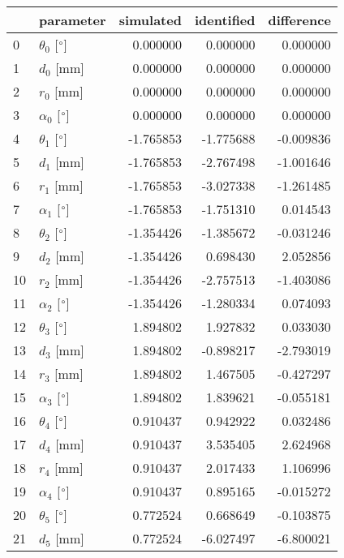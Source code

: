\documentclass{standalone}%
\begin{document}
%
\normalsize%
\begin{tabular}{llrrr}
\toprule
{} &                 parameter & simulated & identified & difference \\
\midrule
0  &  $\theta_{0}$ [$\degree$] &  0.000000 &   0.000000 &   0.000000 \\
1  &              $d_{0}$ [mm] &  0.000000 &   0.000000 &   0.000000 \\
2  &              $r_{0}$ [mm] &  0.000000 &   0.000000 &   0.000000 \\
3  &  $\alpha_{0}$ [$\degree$] &  0.000000 &   0.000000 &   0.000000 \\
4  &  $\theta_{1}$ [$\degree$] & -1.765853 &  -1.775688 &  -0.009836 \\
5  &              $d_{1}$ [mm] & -1.765853 &  -2.767498 &  -1.001646 \\
6  &              $r_{1}$ [mm] & -1.765853 &  -3.027338 &  -1.261485 \\
7  &  $\alpha_{1}$ [$\degree$] & -1.765853 &  -1.751310 &   0.014543 \\
8  &  $\theta_{2}$ [$\degree$] & -1.354426 &  -1.385672 &  -0.031246 \\
9  &              $d_{2}$ [mm] & -1.354426 &   0.698430 &   2.052856 \\
10 &              $r_{2}$ [mm] & -1.354426 &  -2.757513 &  -1.403086 \\
11 &  $\alpha_{2}$ [$\degree$] & -1.354426 &  -1.280334 &   0.074093 \\
12 &  $\theta_{3}$ [$\degree$] &  1.894802 &   1.927832 &   0.033030 \\
13 &              $d_{3}$ [mm] &  1.894802 &  -0.898217 &  -2.793019 \\
14 &              $r_{3}$ [mm] &  1.894802 &   1.467505 &  -0.427297 \\
15 &  $\alpha_{3}$ [$\degree$] &  1.894802 &   1.839621 &  -0.055181 \\
16 &  $\theta_{4}$ [$\degree$] &  0.910437 &   0.942922 &   0.032486 \\
17 &              $d_{4}$ [mm] &  0.910437 &   3.535405 &   2.624968 \\
18 &              $r_{4}$ [mm] &  0.910437 &   2.017433 &   1.106996 \\
19 &  $\alpha_{4}$ [$\degree$] &  0.910437 &   0.895165 &  -0.015272 \\
20 &  $\theta_{5}$ [$\degree$] &  0.772524 &   0.668649 &  -0.103875 \\
21 &              $d_{5}$ [mm] &  0.772524 &  -6.027497 &  -6.800021 \\

\end{tabular}
\end{document}

